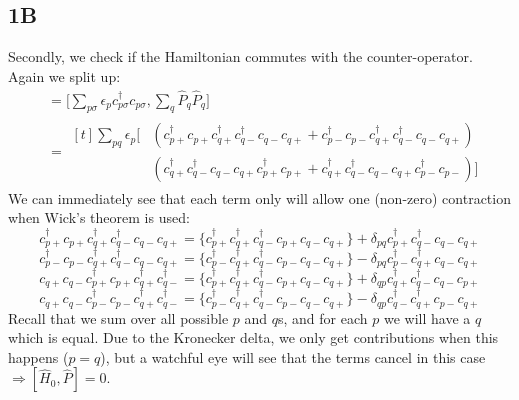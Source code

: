 \documentclass[norsk,a4paper,12pt]{article}
\begin{document}
\subsection*{1B}
Secondly, we check if the Hamiltonian commutes with the counter-operator. Again we split up:
\begin{align*}
[\hat{H}_0, \hat{P}]&=\Big[\sum_{p\sigma}\epsilon_pc_{p\sigma}^{\dagger}c_{p\sigma},\sum_q\hat{P}_q\hat{P}_q\Big]\\
&= \begin{aligned}[t]
\sum_{pq}\epsilon_p\Big[&(c_{p+}^{\dagger}c_{p+}c_{q+}^{\dagger}c_{q-}^{\dagger}c_{q-}c_{q+}
+c_{p-}^{\dagger}c_{p-}c_{q+}^{\dagger}c_{q-}^{\dagger}c_{q-}c_{q+})\\
&(c_{q+}^{\dagger}c_{q-}^{\dagger}c_{q-}c_{q+}c_{p+}^{\dagger}c_{p+}
+c_{q+}^{\dagger}c_{q-}^{\dagger}c_{q-}c_{q+}c_{p-}^{\dagger}c_{p-})\Big]
\end{aligned}
\end{align*}
We can immediately see that each term only will allow one (non-zero) contraction when Wick's theorem is used:
\begin{equation}
c_{p+}^{\dagger}c_{p+}c_{q+}^{\dagger}c_{q-}^{\dagger}c_{q-}c_{q+}=\{c_{p+}^{\dagger}c_{q+}^{\dagger}c_{q-}^{\dagger}c_{p+}c_{q-}c_{q+}\}+\delta_{pq}c_{p+}^{\dagger}c_{q-}^{\dagger}c_{q-}c_{q+}
\end{equation}
\begin{equation}
c_{p-}^{\dagger}c_{p-}c_{q+}^{\dagger}c_{q-}^{\dagger}c_{q-}c_{q+}=\{c_{p-}^{\dagger}c_{q+}^{\dagger}c_{q-}^{\dagger}c_{p-}c_{q-}c_{q+}\}-\delta_{pq}c_{p-}^{\dagger}c_{q+}^{\dagger}c_{q-}c_{q+}
\end{equation}
\begin{equation}
c_{q+}c_{q-}c_{p+}^{\dagger}c_{p+}c_{q+}^{\dagger}c_{q-}^{\dagger}=\{c_{p+}^{\dagger}c_{q+}^{\dagger}c_{q-}^{\dagger}c_{p+}c_{q-}c_{q+}\}+\delta_{qp}c_{q+}^{\dagger}c_{q-}^{\dagger}c_{q-}c_{p+}
\end{equation}
\begin{equation}
c_{q+}c_{q-}c_{p-}^{\dagger}c_{p-}c_{q+}^{\dagger}c_{q-}^{\dagger}=\{c_{p-}^{\dagger}c_{q+}^{\dagger}c_{q-}^{\dagger}c_{p-}c_{q-}c_{q+}\}-\delta_{qp}c_{q-}^{\dagger}c_{q+}^{\dagger}c_{p-}c_{q+}
\end{equation}
Recall that we sum over all possible $p$ and $q$s, and for each $p$ we will have a $q$ which is equal. Due to the Kronecker delta, we only get contributions when this happens ($p=q$), but a watchful eye will see that the terms cancel in this case $\Rightarrow [\hat{H}_0,\hat{P}]=0$.
\end{document}
